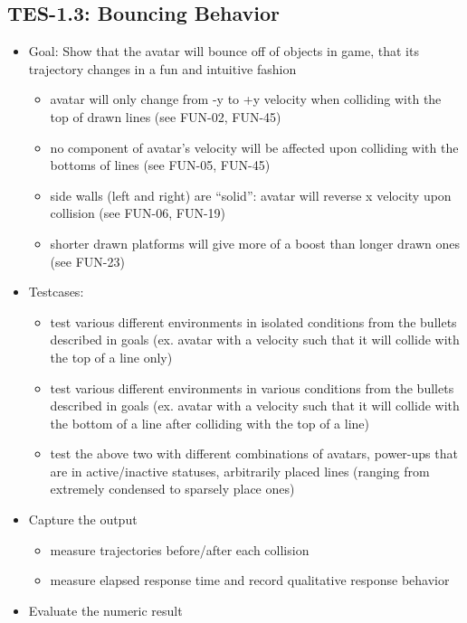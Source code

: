 \subsection{TES-1.3: Bouncing Behavior }
\label{bounce}
\begin{itemize}
\item Goal: Show that the avatar will bounce off of objects in game, that
its trajectory changes in a fun and intuitive fashion 

\begin{itemize}
\item avatar will only change from -y to +y velocity when colliding with
the top of drawn lines (see FUN-02, FUN-45) 
\item no component of avatar\textquoteright{}s velocity will be affected
upon colliding with the bottoms of lines (see FUN-05, FUN-45) 
\item side walls (left and right) are \textquotedblleft{}solid\textquotedblright{}:
avatar will reverse x velocity upon collision (see FUN-06, FUN-19) 
\item shorter drawn platforms will give more of a boost than longer drawn
ones (see FUN-23) 
\end{itemize}
\item Testcases: 

\begin{itemize}
\item test various different environments in isolated conditions from the
bullets described in goals (ex. avatar with a velocity such that it
will collide with the top of a line only) 
\item test various different environments in various conditions from the
bullets described in goals (ex. avatar with a velocity such that it
will collide with the bottom of a line after colliding with the top
of a line) 
\item test the above two with different combinations of avatars, power-ups
that are in active/inactive statuses, arbitrarily placed lines (ranging
from extremely condensed to sparsely place ones) 
\end{itemize}
\item Capture the output 

\begin{itemize}
\item measure trajectories before/after each collision 
\item measure elapsed response time and record qualitative response behavior 
\end{itemize}
\item Evaluate the numeric result 


\end{itemize}
